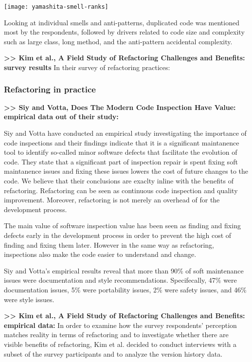 \texttt{[image: yamashita-smell-ranks]}

Looking at individual smells and anti-patterns, duplicated code was mentioned most by the respondents, followed by drivers related to code size and complexity such as large class, long method, and the anti-pattern accidental complexity.

\textbf{>> Kim et al., A Field Study of Refactoring Challenges and Benefits: survey results}
In their survey of refactoring practices:

\subsubsection{Refactoring in practice}

\textbf{>> Siy and Votta, Does The Modern Code Inspection Have Value: empirical data out of their study:}

Siy and Votta have conducted an empirical study investigating the importance of code inspections and their findings indicate that it is a significant maintanence tool to identify so-called minor software defects that facilitate the evolution of code. They state that a significant part of inspection repair is spent fixing soft maintanence issues and fixing these issues lowers the cost of future changes to the code. We believe that their conclusions are exaclty inline with the benefits of refactoring. Refactoring can be seen as continuous code inspection and quality improvement. Moreover, refactoring is not merely an overhead of for the development process.

The main value of software inspection value has been seen as finding and fixing defects early in the development process in order to prevent the high cost of finding and fixing them later. However in the same way as refactoring, inspections also make the code easier to understand and change.

Siy and Votta's empirical results reveal that more than 90\% of soft maintenance issues were documentation and style recommendations. Specifecally, 47\% were documentation issues, 5\% were portability issues, 2\% were safety issues, and 46\% were style issues.

\textbf{>> Kim et al., A Field Study of Refactoring Challenges and Benefits: empirical data:}
In order to examine how the survey respondents’ perception matches reality in terms of refactoring and to investigate whether there are visible benefits of refactoring, Kim et al. decided to conduct interviews with a subset of the survey participants and to analyze the version history data.

